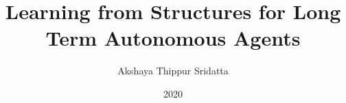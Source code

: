 

\title{Learning from Structures for Long Term Autonomous Agents}
\author{Akshaya Thippur Sridatta}
\date{2020}
\address{Robotics, Perception and Learning\\
         School of Computer Science and Communication\\
         KTH Royal Institute of Technology\\
         SE-100 44 Stockholm, Sweden}

\endinput




